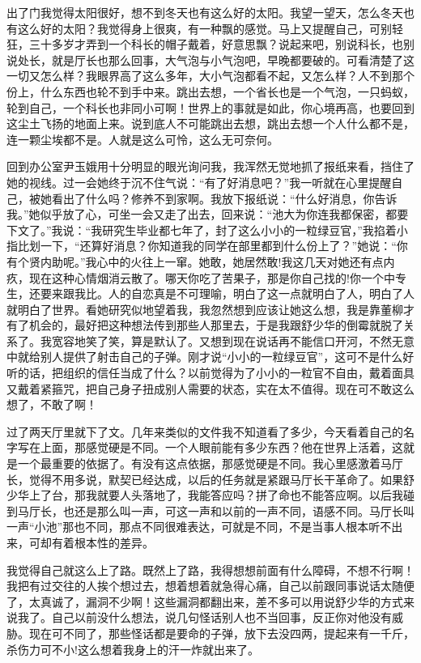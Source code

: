 \documentclass[12pt,oneside]{book}
\begin{document}
出了门我觉得太阳很好，想不到冬天也有这么好的太阳。我望一望天，怎么冬天也有这么好的太阳？我觉得身上很爽，有一种飘的感觉。马上又提醒自己，可别轻狂，三十多岁才弄到一个科长的帽子戴着，好意思飘？说起来吧，别说科长，也别说处长，就是厅长也那么回事，大气泡与小气泡吧，早晚都要破的。可看清楚了这一切又怎么样？我眼界高了这么多年，大小气泡都看不起，又怎么样？人不到那个份上，什么东西也轮不到手中来。跳出去想，一个省长也是一个气泡，一只蚂蚁，轮到自己，一个科长也非同小可啊！世界上的事就是如此，你心境再高，也要回到这尘土飞扬的地面上来。说到底人不可能跳出去想，跳出去想一个人什么都不是，连一颗尘埃都不是。人就是这么可怜，这么无可奈何。

回到办公室尹玉娥用十分明显的眼光询问我，我浑然无觉地抓了报纸来看，挡住了她的视线。过一会她终于沉不住气说：``有了好消息吧？''我一听就在心里提醒自己，被她看出了什么吗？修养不到家啊。我放下报纸说：``什么好消息，你告诉我。''她似乎放了心，可坐一会又走了出去，回来说：``池大为你连我都保密，都要下文了。''我说：``我研究生毕业都七年了，封了这么小小的一粒绿豆官，''我掐着小指比划一下，``还算好消息？你知道我的同学在部里都到什么份上了？''她说：``你有个贤内助呢。''我心中的火往上一窜。她敢，她居然敢!我这几天对她还有点内疚，现在这种心情烟消云散了。哪天你吃了苦果子，那是你自己找的!你一个中专生，还要来跟我比。人的自恋真是不可理喻，明白了这一点就明白了人，明白了人就明白了世界。看她研究似地望着我，我忽然想到应该让她这么想，我是靠董柳才有了机会的，最好把这种想法传到那些人那里去，于是我跟舒少华的倒霉就脱了关系了。我宽容地笑了笑，算是默认了。又想到现在说话再不能信口开河，不然无意中就给别人提供了射击自己的子弹。刚才说``小小的一粒绿豆官''，这可不是什么好听的话，把组织的信任当成了什么？以前觉得为了小小的一粒官不自由，戴着面具又戴着紧箍咒，把自己身子扭成别人需要的状态，实在太不值得。现在可不敢这么想了，不敢了啊！

过了两天厅里就下了文。几年来类似的文件我不知道看了多少，今天看着自己的名字写在上面，那感觉硬是不同。一个人眼前能有多少东西？他在世界上活着，这就是一个最重要的依据了。有没有这点依据，那感觉硬是不同。我心里感激着马厅长，觉得不用多说，默契已经达成，以后的任务就是紧跟马厅长干革命了。如果舒少华上了台，那我就要人头落地了，我能答应吗？拼了命也不能答应啊。以后我碰到马厅长，也还是那么叫一声，可这一声和以前的一声不同，语感不同。马厅长叫一声``小池''那也不同，那点不同很难表达，可就是不同，不是当事人根本听不出来，可却有着根本性的差异。

我觉得自己就这么上了路。既然上了路，我得想想前面有什么障碍，不想不行啊！我把有过交往的人挨个想过去，想着想着就急得心痛，自己以前跟同事说话太随便了，太真诚了，漏洞不少啊！这些漏洞都翻出来，差不多可以用说舒少华的方式来说我了。自己以前没什么想法，说几句怪话别人也不当回事，反正你对他没有威胁。现在可不同了，那些怪话都是要命的子弹，放下去没四两，提起来有一千斤，杀伤力可不小!这么想着我身上的汗一炸就出来了。
\end{document}
